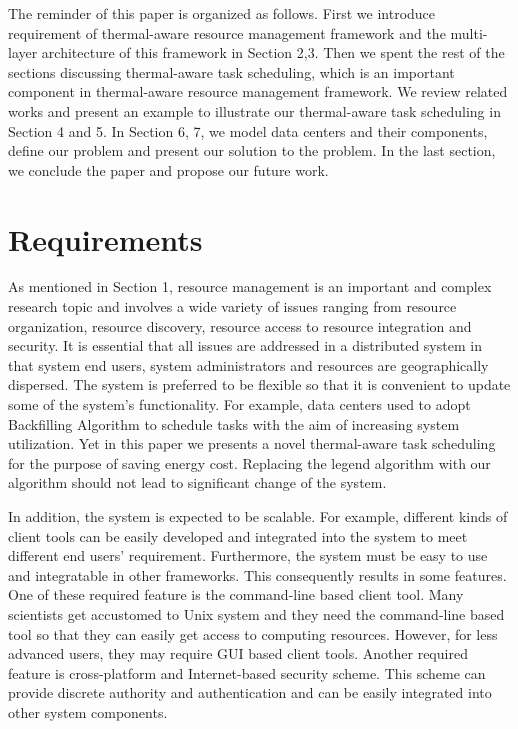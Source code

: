 The reminder of this paper is organized as follows. First we introduce requirement of  thermal-aware resource management framework and the multi-layer architecture of this framework in Section 2,3. Then we spent the rest of the sections discussing  thermal-aware task scheduling, which is an important component in thermal-aware resource management framework. We review related works and present an example to illustrate our thermal-aware task scheduling in Section 4 and 5. In Section 6, 7, we model data centers and their components, define our problem and present our solution to the problem. In the last section, we conclude the paper and propose our future work.

\section{Requirements}\label{S:req}

As mentioned in Section 1, resource management is an important and complex research topic and involves a wide variety of issues ranging from resource organization, resource discovery, resource access to resource integration and security. It is essential that all issues are addressed in a distributed system in that system end users, system administrators and resources are geographically dispersed. The system is preferred to be flexible so that it is convenient to update some of the system's functionality. For example, data centers used to adopt Backfilling Algorithm \cite{DBLP:journals/tpds/MualemF01} to schedule tasks with the aim of increasing system utilization. Yet in this paper we presents a novel thermal-aware task scheduling for the purpose of saving energy cost. Replacing the legend algorithm with our algorithm should not lead to significant change of the system. 

In addition, the system is expected to be scalable. For example, different kinds of client tools can be easily developed and integrated into the system to meet different end users' requirement. Furthermore, the system must be easy to use and integratable in other frameworks. This consequently results in some features. One of these required feature is the command-line based client tool. Many scientists get accustomed to Unix system and they need the command-line based tool so that they can easily get access to computing resources. However, for less advanced users, they may require GUI based client tools. Another required feature is cross-platform and Internet-based security scheme. This scheme can provide discrete authority and authentication and can be easily integrated into other system components.     

